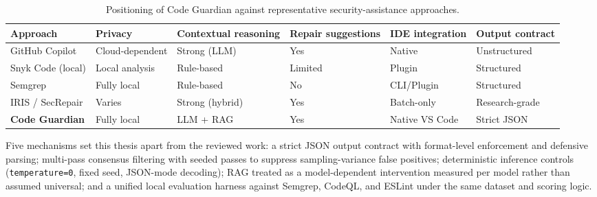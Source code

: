 \begin{table}[H]
  \centering
  \caption{Positioning of Code Guardian against representative security-assistance approaches.}
  \label{tab:positioning-comparison}
  \footnotesize
  \renewcommand{\arraystretch}{1.05}
  \begin{tabularx}{\textwidth}{p{}XXXXX}
    \toprule
    Approach & Privacy & Contextual reasoning & Repair suggestions & IDE integration & Output contract \\
    \midrule
    GitHub Copilot & Cloud-dependent & Strong (LLM) & Yes & Native & Unstructured \\
    Snyk Code (local) & Local analysis & Rule-based & Limited & Plugin & Structured \\
    Semgrep & Fully local & Rule-based & No & CLI/Plugin & Structured \\
    IRIS / SecRepair & Varies & Strong (hybrid) & Yes & Batch-only & Research-grade \\
    \textbf{Code Guardian} & Fully local & LLM + RAG & Yes & Native VS Code & Strict JSON \\
    \bottomrule
  \end{tabularx}
\end{table}

Five mechanisms set this thesis apart from the reviewed work: a strict JSON output contract with format-level enforcement and defensive parsing; multi-pass consensus filtering with seeded passes to suppress sampling-variance false positives; deterministic inference controls (\texttt{temperature=0}, fixed seed, JSON-mode decoding); RAG treated as a model-dependent intervention measured per model rather than assumed universal; and a unified local evaluation harness against Semgrep, CodeQL, and ESLint under the same dataset and scoring logic.
